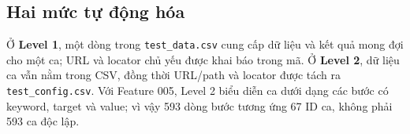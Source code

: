 \subsection{Hai mức tự động hóa}
\label{subsec:automation-levels}
Ở \textbf{Level 1}, một dòng trong \texttt{test\_data.csv} cung cấp dữ liệu và kết quả mong đợi cho một ca; URL và locator chủ yếu được khai báo trong mã. Ở \textbf{Level 2}, dữ liệu ca vẫn nằm trong CSV, đồng thời URL/path và locator được tách ra \texttt{test\_config.csv}. Với Feature 005, Level 2 biểu diễn ca dưới dạng các bước có keyword, target và value; vì vậy 593 dòng bước tương ứng 67 ID ca, không phải 593 ca độc lập.

